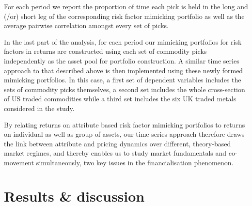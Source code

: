 \documentclass[]{elsarticle} %
\begin{document}
\medskip\setlength{\parindent}{0pt}

For each period we report the proportion of time each pick is held in the long and (/or) short leg of the corresponding risk factor mimicking portfolio as well as the average pairwise correlation amongst every set of picks.

\medskip\setlength{\parindent}{0pt}

In the last part of the analysis, for each period our mimicking portfolios for risk factors in returns are constructed using each set of commodity picks independently as the asset pool for portfolio construction. A similar time series approach to that described above is then implemented using these newly formed mimicking portfolios. In this case, a first set of dependent variables includes the sets of commodity picks themselves, a second set includes the whole cross-section of US traded commodities while a third set includes the six UK traded metals considered in the study.

\bigskip\bigskip\setlength{\parindent}{0pt}

By relating returns on attribute based risk factor mimicking portfolios to returns on individual as well as group of assets, our time series approach therefore draws the link between attribute and pricing dynamics over different, theory-based market regimes, and thereby enables us to study market fundamentals and co-movement simultaneously, two key issues in the financialisation phenomenon.

\newpage

\hypertarget{results}{%
\section{Results \& discussion}\label{results}}
\end{document}
